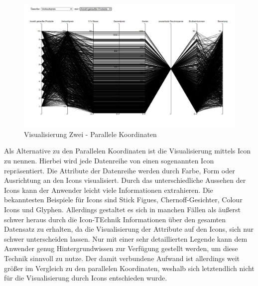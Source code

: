\documentclass[usegeometry=true]{scrartcl}
\begin{document}
\begin{figure} [H]
	\begin{center}
		\includegraphics[width=15cm]{IMG/ParCoord}
		\caption{Visualisierung Zwei - Parallele Koordinaten}
		\label{fig:ParCoord}
	\end{center}
\end{figure}
Als Alternative zu den Parallelen Koordinaten ist die Visualisierung mittels Icon zu nennen. Hierbei wird jede Datenreihe von einen sogenannten Icon repräsentiert. Die
Attribute der Datenreihe werden durch Farbe, Form oder Ausrichtung an den Icons visualisiert. \cite[14]{a3096a239a3d49e49e8ffde9a34d754a} Durch das unterschiedliche Aussehen
der Icons kann der Anwender leicht viele Informationen extrahieren. Die bekanntesten Beispiele für Icons sind Stick Figues, Chernoff-Gesichter, Colour Icons und Glyphen.
\cite[14-16]{a3096a239a3d49e49e8ffde9a34d754a} Allerdings gestaltet es sich in manchen Fällen als äußerst schwer heraus durch die Icon-TEchnik Informationen über den gesamten
Datensatz zu erhalten, da die Visualisierung der Attribute auf den Icons, sich nur schwer unterscheiden lassen. Nur mit einer sehr detaillierten Legende kann dem Anwender
genug Hintergrundwissen zur Verfügung gestellt werden, um diese Technik sinnvoll zu nutze. Der damit verbundene Aufwand ist allerdings weit größer im Vergleich zu den parallelen
Koordinaten, weshalb sich letztendlich nicht für die Visualisierung durch Icons entschieden wurde.
\end{document}
